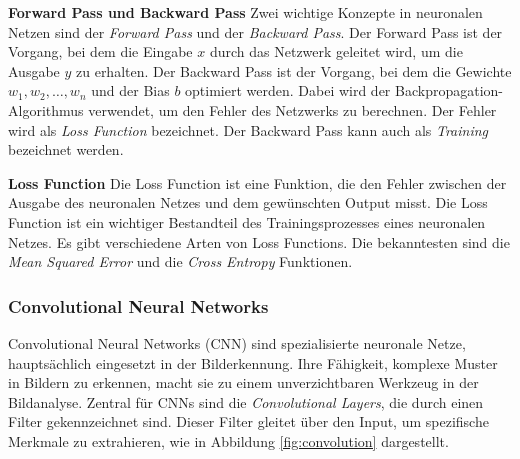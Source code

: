 \documentclass[11pt,a4paper]{article}
\begin{document}
\noindent \newline \textbf{Forward Pass und Backward Pass} \newline
Zwei wichtige Konzepte in neuronalen Netzen sind der \textit{Forward Pass} und der
\textit{Backward Pass}. Der Forward Pass ist der Vorgang, bei dem die Eingabe \(x\) durch das
Netzwerk geleitet wird, um die Ausgabe \(y\) zu erhalten. Der Backward Pass ist der Vorgang, bei
dem die Gewichte \(w_{1}, w_{2}, \dots, w_{n}\) und der Bias \(b\) optimiert werden. Dabei wird
der Backpropagation-Algorithmus verwendet, um den Fehler des Netzwerks zu berechnen. Der Fehler 
wird als \textit{Loss Function} bezeichnet. Der Backward Pass kann auch als \textit{Training} 
bezeichnet werden.

\noindent \newline \textbf{Loss Function} \newline
Die Loss Function ist eine Funktion, die den Fehler zwischen der Ausgabe des neuronalen Netzes und
dem gewünschten Output misst. Die Loss Function ist ein wichtiger Bestandteil des Trainingsprozesses
eines neuronalen Netzes. Es gibt verschiedene Arten von Loss Functions. Die bekanntesten sind die
\textit{Mean Squared Error} und die \textit{Cross Entropy} Funktionen.


\subsubsection{Convolutional Neural Networks}
Convolutional Neural Networks (CNN) sind spezialisierte neuronale Netze, hauptsächlich eingesetzt 
in der Bilderkennung. Ihre Fähigkeit, komplexe Muster in Bildern zu erkennen, macht sie zu einem 
unverzichtbaren Werkzeug in der Bildanalyse. Zentral für CNNs sind die 
\textit{Convolutional Layers}, die durch einen Filter gekennzeichnet sind. Dieser Filter gleitet 
über den Input, um spezifische Merkmale zu extrahieren, wie in Abbildung \ref{fig:convolution} 
dargestellt.
\end{document}
